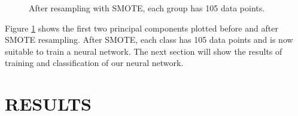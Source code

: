 \documentclass[]{spie}  %
\begin{document}
\begin{figure}[h]
\centering 
    \caption{After resampling with SMOTE, each group has 105 data points.}
    \label{fig:SMOTEresample}
\end{figure}
Figure \ref{fig:SMOTEresample} shows the first two principal components plotted
before and after SMOTE resampling. After SMOTE, each class has 105 data points
and is now suitable to train a neural network. 
The next section will show the results of training and classification of our neural network. 

\section{RESULTS}
\end{document}
